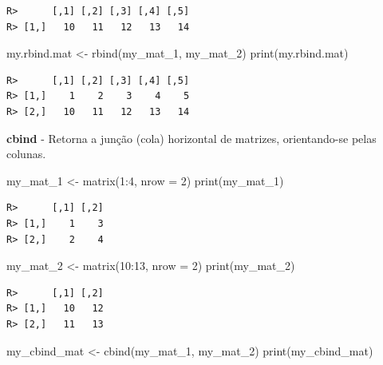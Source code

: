 \documentclass[
  11pt,
]{book}
\newenvironment{Shaded}{\begin{snugshade}}{\end{snugshade}}
\newcommand{\AttributeTok}[1]{\textcolor[rgb]{0.61,0.61,0.61}{#1}}
\newcommand{\DecValTok}[1]{\textcolor[rgb]{0.06,0.06,0.06}{#1}}
\newcommand{\FunctionTok}[1]{\textcolor[rgb]{0,0,0}{#1}}
\newcommand{\NormalTok}[1]{#1}
\newcommand{\OtherTok}[1]{\textcolor[rgb]{0.37,0.37,0.37}{#1}}
\newcommand{\SpecialCharTok}[1]{\textcolor[rgb]{0,0,0}{#1}}
\begin{document}
\begin{verbatim}
R>      [,1] [,2] [,3] [,4] [,5]
R> [1,]   10   11   12   13   14
\end{verbatim}

\begin{Shaded}
\begin{Highlighting}[]
\NormalTok{my.rbind.mat }\OtherTok{\textless{}{-}} \FunctionTok{rbind}\NormalTok{(my\_mat\_1, my\_mat\_2)}
\FunctionTok{print}\NormalTok{(my.rbind.mat)}
\end{Highlighting}
\end{Shaded}

\begin{verbatim}
R>      [,1] [,2] [,3] [,4] [,5]
R> [1,]    1    2    3    4    5
R> [2,]   10   11   12   13   14
\end{verbatim}

\textbf{cbind} - Retorna a junção (cola) horizontal de matrizes, orientando-se pelas colunas.

\begin{Shaded}
\begin{Highlighting}[]
\NormalTok{my\_mat\_1 }\OtherTok{\textless{}{-}} \FunctionTok{matrix}\NormalTok{(}\DecValTok{1}\SpecialCharTok{:}\DecValTok{4}\NormalTok{, }\AttributeTok{nrow =} \DecValTok{2}\NormalTok{)}
\FunctionTok{print}\NormalTok{(my\_mat\_1)}
\end{Highlighting}
\end{Shaded}

\begin{verbatim}
R>      [,1] [,2]
R> [1,]    1    3
R> [2,]    2    4
\end{verbatim}

\begin{Shaded}
\begin{Highlighting}[]
\NormalTok{my\_mat\_2 }\OtherTok{\textless{}{-}} \FunctionTok{matrix}\NormalTok{(}\DecValTok{10}\SpecialCharTok{:}\DecValTok{13}\NormalTok{, }\AttributeTok{nrow =} \DecValTok{2}\NormalTok{)}
\FunctionTok{print}\NormalTok{(my\_mat\_2)}
\end{Highlighting}
\end{Shaded}

\begin{verbatim}
R>      [,1] [,2]
R> [1,]   10   12
R> [2,]   11   13
\end{verbatim}

\begin{Shaded}
\begin{Highlighting}[]
\NormalTok{my\_cbind\_mat }\OtherTok{\textless{}{-}} \FunctionTok{cbind}\NormalTok{(my\_mat\_1, my\_mat\_2)}
\FunctionTok{print}\NormalTok{(my\_cbind\_mat)}
\end{Highlighting}
\end{Shaded}
\end{document}
